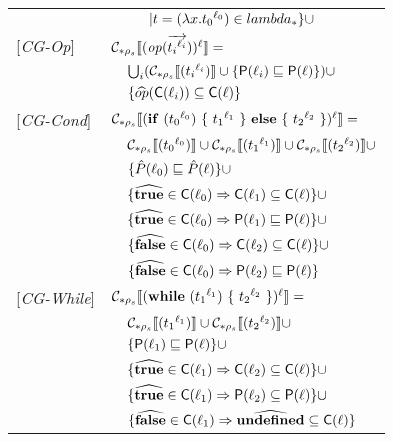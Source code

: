 \documentclass[[12pt,a4paper,twoside,openrigh]{article}
\newcommand{\Pat}[0]{\hat{P}}
\newcommand{\lbt}[1]{{t_#1}^{\ell_#1}}
\begin{document}
\begin{tabular}{l l l l}
&&&$| t = (\lam {x} {\lbt 0}) \in lambda_* \}\cup$\\
{[\textit{CG-Op}]}&\multicolumn{3}{l}{$ \genl {\op (\vec{\lbt i})} = $}\\
&&\multicolumn{2}{l}{$\bigcup_i (\gen {\lbt i} \cup \braces{\Pel(\ell_i) \sqsubseteq \Pel(\ell)})\cup$}\\
&&\multicolumn{2}{l}{$\{ \widehat{op} (\mathsf{C}(\ell_i)) \subseteq \mathsf{C}(\ell) \}$}\\
{[\textit{CG-Cond}]}&\multicolumn{3}{l}{$\genl{\cond {\lbt 0} {\lbt 1} {\lbt 2}} = $}\\
&&\multicolumn{2}{l}{$ \gen {\lbt 0} \cup \gen {\lbt 1} \cup \gen {\lbt 2} \cup$}\\
&&\multicolumn{2}{l}{$\braces{\Pat(\ell_0) \sqsubseteq \Pat(\ell)} \cup$} \\
&&\multicolumn{2}{l}{$\{ \widehat{\mathbf{true}} \in \mathsf{C}(\ell_0) \Rightarrow \mathsf{C}(\ell_1) \subseteq \mathsf{C}(\ell) \}\cup$}\\
&&\multicolumn{2}{l}{$\{ \widehat{\mathbf{true}} \in \mathsf{C}(\ell_0) \Rightarrow \mathsf{P}(\ell_1) \sqsubseteq \mathsf{P}(\ell) \}\cup$} \\
&&\multicolumn{2}{l}{$\{ \widehat{\mathbf{false}} \in \mathsf{C}(\ell_0) \Rightarrow \mathsf{C}(\ell_2) \subseteq \mathsf{C}(\ell) \}\cup$}\\
&&\multicolumn{2}{l}{$\{ \widehat{\mathbf{false}} \in \mathsf{C}(\ell_0) \Rightarrow \mathsf{P}(\ell_2) \sqsubseteq \mathsf{P}(\ell) \}$} \\
{[\textit{CG-While}]}&\multicolumn{3}{l}{$\genl {\while {\lbt 1} {\lbt 2}} = $}\\
&&\multicolumn{2}{l}{$ \gen {\lbt 1} \cup \gen {\lbt 2} \cup $}\\
&&\multicolumn{2}{l}{$\{ \mathsf{P}(\ell_1) \sqsubseteq \mathsf{P}(\ell) \} \cup$} \\
&&\multicolumn{2}{l}{$\{ \widehat{\mathbf{true}} \in \mathsf{C}(\ell_1) \Rightarrow \mathsf{C}(\ell_2) \subseteq \mathsf{C}(\ell)  \}\cup$}\\
&&\multicolumn{2}{l}{$\{ \widehat{\mathbf{true}} \in \mathsf{C}(\ell_1) \Rightarrow \mathsf{P}(\ell_2) \subseteq \mathsf{P}(\ell)  \}\cup$}\\
&&\multicolumn{2}{l}{$\{ \widehat{\mathbf{false}} \in \mathsf{C}(\ell_1) \Rightarrow \widehat{\mathbf{undefined}} \subseteq \mathsf{C}(\ell) \}$}\\
\end{tabular}
\newpage
\end{document}
